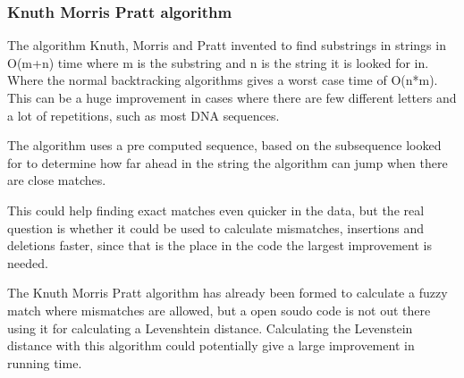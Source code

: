 \documentclass[12pt]{article}
\begin{document}
\subsubsection{Knuth Morris Pratt algorithm}
The algorithm Knuth, Morris and Pratt invented to find substrings in strings in O(m+n) time where m is the substring and n is the string it is looked for in. Where the normal backtracking algorithms gives a worst case time of O(n*m). This can be a huge improvement in cases where there are few different letters and a lot of repetitions, such as most DNA sequences.

The algorithm uses a pre computed sequence, based on the subsequence looked for to determine how far ahead in the string the algorithm can jump when there are close matches.

This could help finding exact matches even quicker in the data, but the real question is whether it could be used to calculate mismatches, insertions and deletions faster, since that is the place in the code the largest improvement is needed.

The Knuth Morris Pratt algorithm has already been formed to calculate a fuzzy match where mismatches are allowed, but a open soudo code is not out there using it for calculating a Levenshtein distance. Calculating the Levenstein distance with this algorithm could potentially give a large improvement in running time.
 
\end{document}
